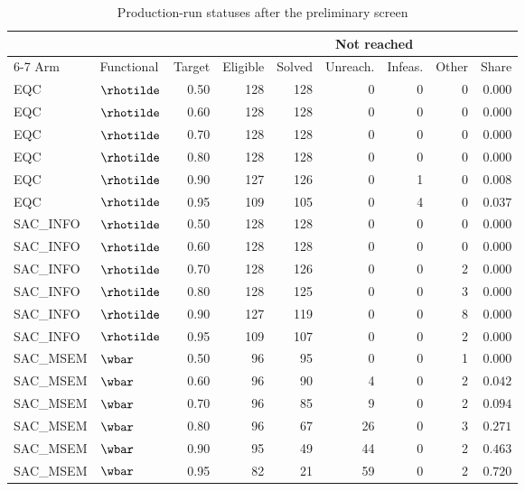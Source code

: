 \begin{table}[htbp]\centering
\caption{Production-run statuses after the preliminary screen}
\label{tab:s2-reachability}
{\small\begin{tabular}{llrrrrrrr}
\toprule
 & & & & & \multicolumn{2}{c}{Not reached} & & \\
\cmidrule(lr){6-7}
Arm & Functional & Target & Eligible & Solved & Unreach. & Infeas. & Other & Share \\
\midrule
EQC & $\rhotilde$ & 0.50 & 128 & 128 & 0 & 0 & 0 & $0.000$ \\
EQC & $\rhotilde$ & 0.60 & 128 & 128 & 0 & 0 & 0 & $0.000$ \\
EQC & $\rhotilde$ & 0.70 & 128 & 128 & 0 & 0 & 0 & $0.000$ \\
EQC & $\rhotilde$ & 0.80 & 128 & 128 & 0 & 0 & 0 & $0.000$ \\
EQC & $\rhotilde$ & 0.90 & 127 & 126 & 0 & 1 & 0 & $0.008$ \\
EQC & $\rhotilde$ & 0.95 & 109 & 105 & 0 & 4 & 0 & $0.037$ \\
SAC\_INFO & $\rhotilde$ & 0.50 & 128 & 128 & 0 & 0 & 0 & $0.000$ \\
SAC\_INFO & $\rhotilde$ & 0.60 & 128 & 128 & 0 & 0 & 0 & $0.000$ \\
SAC\_INFO & $\rhotilde$ & 0.70 & 128 & 126 & 0 & 0 & 2 & $0.000$ \\
SAC\_INFO & $\rhotilde$ & 0.80 & 128 & 125 & 0 & 0 & 3 & $0.000$ \\
SAC\_INFO & $\rhotilde$ & 0.90 & 127 & 119 & 0 & 0 & 8 & $0.000$ \\
SAC\_INFO & $\rhotilde$ & 0.95 & 109 & 107 & 0 & 0 & 2 & $0.000$ \\
SAC\_MSEM & $\wbar$ & 0.50 & 96 & 95 & 0 & 0 & 1 & $0.000$ \\
SAC\_MSEM & $\wbar$ & 0.60 & 96 & 90 & 4 & 0 & 2 & $0.042$ \\
SAC\_MSEM & $\wbar$ & 0.70 & 96 & 85 & 9 & 0 & 2 & $0.094$ \\
SAC\_MSEM & $\wbar$ & 0.80 & 96 & 67 & 26 & 0 & 3 & $0.271$ \\
SAC\_MSEM & $\wbar$ & 0.90 & 95 & 49 & 44 & 0 & 2 & $0.463$ \\
SAC\_MSEM & $\wbar$ & 0.95 & 82 & 21 & 59 & 0 & 2 & $0.720$ \\
\bottomrule
\end{tabular}}
\end{table}
